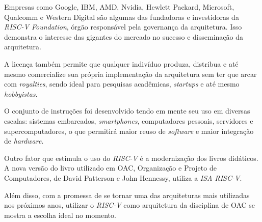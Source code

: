 {
    Empresas como Google, IBM, AMD, Nvidia, Hewlett Packard, Microsoft,
    Qualcomm e Western Digital são algumas das fundadoras e investidoras
    da \textit{RISC-V Foundation}, órgão responsável pela governança da
    arquitetura. Isso demonstra o interesse das gigantes do mercado no
    sucesso e disseminação da arquitetura.
}

{
    A licença também permite que qualquer indivíduo produza, distribua e
    até mesmo comercialize sua própria implementação da arquitetura sem ter
    que arcar com \textit{royalties}, sendo ideal para pesquisas acadêmicas,
    \textit{startups} e até mesmo \textit{hobbyistas}.
}

{
    O conjunto de instruções foi desenvolvido tendo em mente seu uso em
    diversas escalas: sistemas embarcados, \textit{smartphones},
    computadores pessoais, servidores e supercomputadores, o que permitirá
    maior reuso de \textit{software} e maior integração de
    \textit{hardware}.
}

{
    Outro fator que estimula o uso do \textit{RISC-V} é a modernização dos
    livros didáticos. A nova versão do livro utilizado em OAC, Organização
    e Projeto de Computadores, de David Patterson e John Hennessy, utiliza
    a \textit{ISA RISC-V}.
}

{
    Além disso, com a promessa de se tornar uma das arquiteturas mais utilizadas
    nos próximos anos, utilizar o \textit{RISC-V} como arquitetura da disciplina
    de OAC se mostra a escolha ideal no momento.
}

